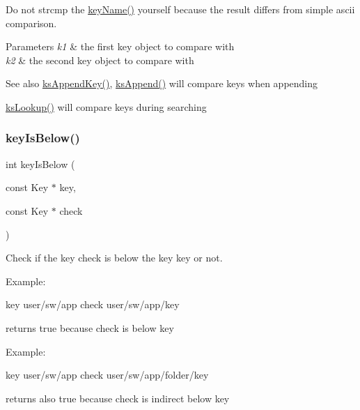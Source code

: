 Do not strcmp the \hyperlink{group__keyname_ga8e805c726a60da921d3736cda7813513}{key\+Name()} yourself because the result differs from simple ascii comparison.


\begin{DoxyParams}{Parameters}
{\em k1} & the first key object to compare with \\
\hline
{\em k2} & the second key object to compare with\\
\hline
\end{DoxyParams}
\begin{DoxySeeAlso}{See also}
\hyperlink{group__keyset_gaa5a1d467a4d71041edce68ea7748ce45}{ks\+Append\+Key()}, \hyperlink{group__keyset_ga21eb9c3a14a604ee3a8bdc779232e7b7}{ks\+Append()} will compare keys when appending 

\hyperlink{group__keyset_ga60f1ddcf23272f2b29b90e92ebe9b56f}{ks\+Lookup()} will compare keys during searching 
\end{DoxySeeAlso}
\mbox{\label{group__keytest_ga03332b5d97c76a4fd2640aca4762b8df}} 
\subsubsection{\texorpdfstring{key\+Is\+Below()}{keyIsBelow()}}
{\footnotesize\ttfamily int key\+Is\+Below (\begin{DoxyParamCaption}\item[{const Key $\ast$}]{key,  }\item[{const Key $\ast$}]{check }\end{DoxyParamCaption})}



Check if the key check is below the key key or not. 

Example\+: \begin{DoxyVerb}key user/sw/app
check user/sw/app/key
\end{DoxyVerb}


returns true because check is below key

Example\+: \begin{DoxyVerb}key user/sw/app
check user/sw/app/folder/key
\end{DoxyVerb}


returns also true because check is indirect below key

